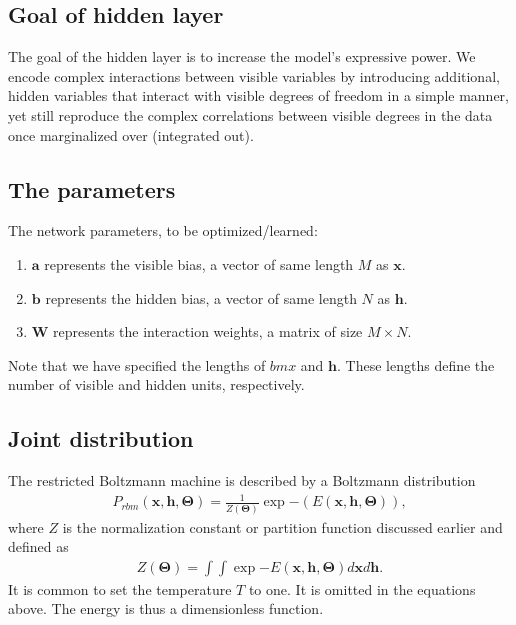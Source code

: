 \documentclass[%
oneside,                 %
final,                   %
10pt]{article}
\begin{document}
\noindent
\subsection{Goal of hidden layer}

The goal of the hidden layer is to increase the model's expressive
power. We encode complex interactions between visible variables by
introducing additional, hidden variables that interact with visible
degrees of freedom in a simple manner, yet still reproduce the complex
correlations between visible degrees in the data once marginalized
over (integrated out).

\subsection{The parameters}

The network parameters, to be optimized/learned:
\begin{enumerate}
\item $\bm{a}$ represents the visible bias, a vector of same length $M$ as $\bm{x}$.

\item $\bm{b}$ represents the hidden bias, a vector of same length $N$  as $\bm{h}$.

\item $\bm{W}$ represents the interaction weights, a matrix of size $M\times N$.
\end{enumerate}

\noindent
Note that we have specified the lengths of $bm{x}$ and $\bm{h}$. These
lengths define the number of visible and hidden units, respectively.

\subsection{Joint distribution}

The restricted Boltzmann machine is described by a Boltzmann distribution
\begin{align*}
	P_{rbm}(\bm{x},\bm{h},\bm{\Theta}) = \frac{1}{Z(\bm{\Theta})} \exp{-(E(\bm{x},\bm{h},\bm{\Theta}))},
\end{align*}
where $Z$ is the normalization constant or partition function discussed earlier and defined as 
\begin{align*}
	Z(\bm{\Theta}) = \int \int \exp{-E(\bm{x},\bm{h},\bm{\Theta})} d\bm{x} d\bm{h}.
\end{align*}
It is common to set  the temperature $T$ to one. It is omitted in the equations above. The energy is thus a dimensionless function.
\end{document}
